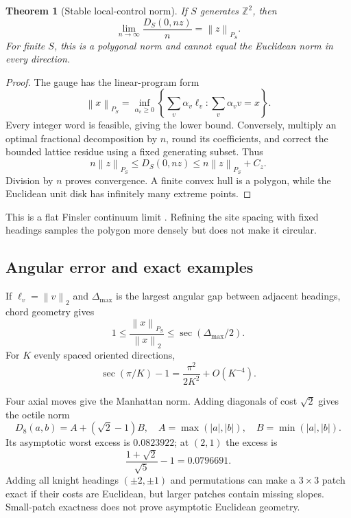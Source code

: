 \documentclass[11pt]{article}
\newtheorem{theorem}{Theorem}[section]
\theoremstyle{definition}\newtheorem{definition}[theorem]{Definition}
\theoremstyle{remark}\newtheorem{remark}[theorem]{Remark}
\newcommand{\Z}{\mathbb Z}
\newcommand{\norm}[1]{\left\lVert #1\right\rVert}
\newcommand{\abs}[1]{\left\lvert #1\right\rvert}
\begin{document}
\begin{theorem}[Stable local-control norm]
\label{thm:stable}
If \(S\) generates \(\Z^2\), then
\[
\lim_{n\to\infty}\frac{D_S(0,nz)}n=\norm z_{P_S}.
\]
For finite \(S\), this is a polygonal norm and cannot equal the Euclidean norm
in every direction.
\end{theorem}
\begin{proof}
The gauge has the linear-program form
\[
\norm x_{P_S}=\inf_{\alpha_v\ge0}
\left\{\sum_v\alpha_v\ell_v:\sum_v\alpha_vv=x\right\}.
\]
Every integer word is feasible, giving the lower bound. Conversely, multiply
an optimal fractional decomposition by \(n\), round its coefficients, and
correct the bounded lattice residue using a fixed generating subset. Thus
\[
n\norm z_{P_S}\le D_S(0,nz)\le n\norm z_{P_S}+C_z.
\]
Division by \(n\) proves convergence. A finite convex hull is a polygon, while
the Euclidean unit disk has infinitely many extreme points.
\end{proof}
This is a flat Finsler continuum limit \cite{bao2000,burago2001}. Refining the
site spacing with fixed headings samples the polygon more densely but does not
make it circular.

\subsection{Angular error and exact examples}

If \(\ell_v=\norm v_2\) and \(\Delta_{\max}\) is the largest angular gap
between adjacent headings, chord geometry gives
\begin{equation}
1\le\frac{\norm x_{P_S}}{\norm x_2}\le
\sec(\Delta_{\max}/2).
\label{eq:angular}
\end{equation}
For \(K\) evenly spaced oriented directions,
\[
\sec(\pi/K)-1=\frac{\pi^2}{2K^2}+O(K^{-4}).
\]

Four axial moves give the Manhattan norm. Adding diagonals of cost \(\sqrt2\)
gives the octile norm
\begin{equation}
D_8(a,b)=A+(\sqrt2-1)B,\quad
A=\max(\abs a,\abs b),\quad B=\min(\abs a,\abs b).
\label{eq:octile}
\end{equation}
Its asymptotic worst excess is \(0.0823922\); at \((2,1)\) the excess is
\[
\frac{1+\sqrt2}{\sqrt5}-1=0.0796691.
\]
Adding all knight headings \((\pm2,\pm1)\) and permutations can make a
\(3\times3\) patch exact if their costs are Euclidean, but larger patches
contain missing slopes. Small-patch exactness does not prove asymptotic
Euclidean geometry.
\end{document}
